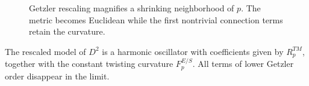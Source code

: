 \documentclass[11pt,oneside,reqno]{book}
\theoremstyle{plain}
\theoremstyle{definition}
\theoremstyle{remark}
\begin{document}
\begin{figure}[htbp]
\centering
{}
\caption[Getzler rescaling near a base point]{Getzler rescaling magnifies a shrinking neighborhood of \(p\).
The metric becomes Euclidean while the first nontrivial connection terms
retain the curvature.}
\end{figure}

The rescaled model of \(D^2\) is a harmonic oscillator with coefficients
given by \(R^{TM}_p\), together with the constant twisting curvature
\(F^{E/S}_p\). All terms of lower Getzler order disappear in the limit.
\end{document}
